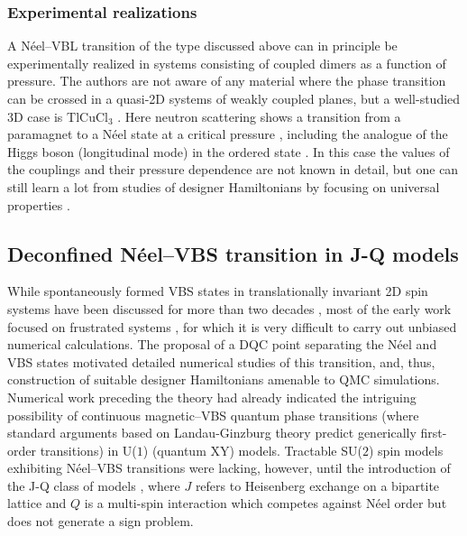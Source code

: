 \documentclass[10pt,pre,aps,twocolumn,showpacs,subscriptaddresses,floatfix]{revtex4}
\begin{document}
\subsubsection{Experimental realizations}
A N\'eel--VBL transition of the type discussed above can in principle be experimentally realized in systems consisting of coupled dimers as a function 
of pressure. The authors are not aware of any material where the phase transition can be crossed in a quasi-2D systems of weakly 
coupled planes, but a well-studied 3D case is TlCuCl$_3$ \cite{Cavadini01,Ruegg04}. Here neutron scattering shows a transition from a paramagnet 
to a N\'eel state at a critical pressure \cite{Ruegg08}, including the analogue of the Higgs boson (longitudinal mode) in the ordered 
state \cite{Sachdev09}. In this case the values of the couplings and their pressure dependence are not known in detail, but one can still learn a lot from 
studies of designer Hamiltonians by focusing on universal properties \cite{Troyer97,Yao07,Jin12,Oitmaa11}.

\subsection{Deconfined N\'eel--VBS transition in J-Q models}
\label{ss:jq2}
While spontaneously formed VBS states in translationally invariant 2D spin systems have been discussed for more than two decades \cite{Chandra88,Dagotto89,Read89},
most of the early work focused on frustrated systems \cite{Dagotto89,Schulz96,Capriotti01}, for which it is very difficult to carry out unbiased numerical 
calculations. The proposal of a DQC point separating the N\'eel and VBS states motivated detailed numerical studies of this transition, and, thus, construction 
of suitable designer Hamiltonians amenable to QMC simulations. Numerical work preceding the theory \cite{Sandvik02} had already indicated the intriguing possibility 
of continuous magnetic--VBS quantum phase transitions (where standard arguments based on Landau-Ginzburg theory predict generically first-order transitions) in
U($1$) (quantum XY) models. Tractable SU($2$) spin models exhibiting N\'eel--VBS transitions were lacking, however, until the introduction of the J-Q class of 
models \cite{Sandvik07}, where $J$ refers to Heisenberg exchange on a bipartite lattice and $Q$ is a multi-spin interaction which competes against N\'eel 
order but does not generate a sign problem. 
\end{document}
